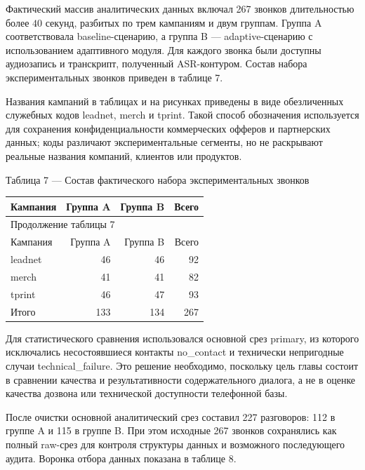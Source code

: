 \documentclass[a4paper,14pt]{extarticle}
\renewcommand{\texttt}[1]{\textnormal{#1}}
\newcounter{none}
\newcommand{\VkrTableCaption}[1]{%
  \Needspace{0.44\textheight}%
  \par\smallskip
  {\singlespacing\noindent #1\par}%
  \vspace{2pt}%
}
\begin{document}
Фактический массив аналитических данных включал 267 звонков
длительностью более \(40\) секунд, разбитых по трем кампаниям и двум
группам. Группа \texttt{A} соответствовала baseline-сценарию, а группа
\texttt{B} --- adaptive-сценарию с использованием адаптивного модуля.
Для каждого звонка были доступны аудиозапись и транскрипт, полученный
ASR-контуром. Состав набора экспериментальных звонков приведен в таблице
7.

Названия кампаний в таблицах и на рисунках приведены в виде обезличенных
служебных кодов \texttt{leadnet}, \texttt{merch} и \texttt{tprint}.
Такой способ обозначения используется для сохранения конфиденциальности
коммерческих офферов и партнерских данных; коды различают
экспериментальные сегменты, но не раскрывают реальные названия компаний,
клиентов или продуктов.

\VkrTableCaption{Таблица 7 --- Состав фактического набора экспериментальных звонков}

{\def\LTcaptype{none} %
\begin{longtable}[]{|l|r|r|r|}
\hline
Кампания & Группа A & Группа B & Всего \\
\hline
\endfirsthead
\hline\multicolumn{4}{|l|}{\small Продолжение таблицы 7}\\
\hline
Кампания & Группа A & Группа B & Всего \\
\hline
\endhead
\hline
\endfoot
\hline
\endlastfoot
leadnet & 46 & 46 & 92 \\
merch & 41 & 41 & 82 \\
tprint & 46 & 47 & 93 \\
Итого & 133 & 134 & 267 \\
\end{longtable}
}

Для статистического сравнения использовался основной срез
\texttt{primary}, из которого исключались несостоявшиеся контакты
\texttt{no\_\allowbreak{}contact} и технически непригодные случаи
\texttt{technical\_\allowbreak{}failure}. Это решение необходимо, поскольку цель
главы состоит в сравнении качества и результативности содержательного
диалога, а не в оценке качества дозвона или технической доступности
телефонной базы.

После очистки основной аналитический срез составил 227 разговоров: 112 в
группе \texttt{A} и 115 в группе \texttt{B}. При этом исходные 267
звонков сохранялись как полный raw-срез для контроля структуры данных и
возможного последующего аудита. Воронка отбора данных показана в таблице
8.
\end{document}
